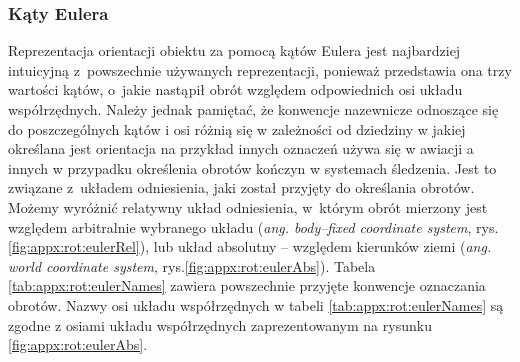 \subsubsection*{Kąty Eulera} \label{sec:orientstionRep:euler}
Reprezentacja orientacji obiektu za pomocą kątów Eulera jest najbardziej intuicyjną z~powszechnie używanych reprezentacji, ponieważ przedstawia ona trzy wartości kątów, o~jakie nastąpił obrót względem odpowiednich osi układu współrzędnych. Należy jednak pamiętać, że konwencje nazewnicze odnoszące się do poszczególnych kątów i osi różnią się w zależności od dziedziny w jakiej określana jest orientacja na przykład innych oznaczeń używa się w awiacji a innych w przypadku określenia obrotów kończyn w systemach śledzenia. Jest to związane z~układem odniesienia, jaki został przyjęty do określania obrotów. Możemy wyróżnić relatywny układ odniesienia, w~którym obrót mierzony jest względem arbitralnie wybranego układu (\emph{ang. body--fixed coordinate system}, rys.\ref{fig:appx:rot:eulerRel}), lub układ absolutny -- względem kierunków ziemi (\emph{ang. world coordinate system}, rys.\ref{fig:appx:rot:eulerAbs}). Tabela \ref{tab:appx:rot:eulerNames} zawiera powszechnie przyjęte konwencje oznaczania obrotów. Nazwy osi układu współrzędnych w tabeli  \ref{tab:appx:rot:eulerNames} są zgodne z osiami układu współrzędnych zaprezentowanym na rysunku \ref{fig:appx:rot:eulerAbs}.
																													
